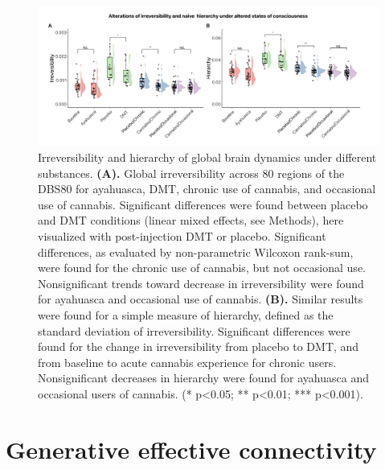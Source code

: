 \begin{figure}[h!]
    \centering
    \includegraphics[width=\textwidth]{images/Figure 2_ Nonreversibility.png}
    \caption[Irreversibility and hierarchy of global brain dynamics under
different substances.]{Irreversibility and hierarchy of global brain dynamics under
different substances. \textbf{(A).} Global irreversibility across 80
regions of the DBS80 for ayahuasca, DMT, chronic use of cannabis, and
occasional use of cannabis. Significant differences were found between
placebo and DMT conditions (linear mixed effects, see Methods), here
visualized with post-injection DMT or placebo. Significant differences,
as evaluated by non-parametric Wilcoxon rank-sum, were found for the
chronic use of cannabis, but not occasional use. Nonsignificant trends
toward decrease in irreversibility were found for ayahuasca and
occasional use of cannabis. \textbf{(B).} Similar results were found for
a simple measure of hierarchy, defined as the standard deviation of
irreversibility. Significant differences were found for the change in
irreversibility from placebo to DMT, and from baseline to acute cannabis
experience for chronic users. Nonsignificant decreases in hierarchy were
found for ayahuasca and occasional users of cannabis. (* p\textless0.05;
** p\textless0.01; *** p\textless0.001).}
    \label{fig:ir}
\end{figure}

\section{Generative effective
connectivity}\label{generative-effective-connectivity}

